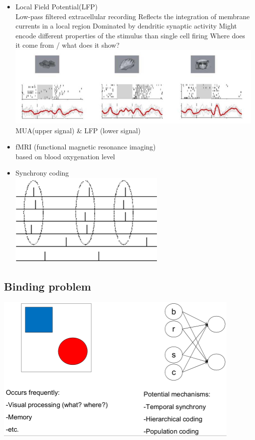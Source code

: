 \documentclass[english,11pt]{article}
\begin{document}
\begin{itemize}
\item  Local Field Potential(LFP)\\
\subitem Low-pass filtered extracellular recording
\subitem Reflects the integration of membrane currents in a local region
\subitem Dominated by dendritic synaptic activity
\subitem Might encode different properties of the stimulus than single cell firing
\subitem Where does it come from / what does it show?
\subitem\includegraphics[width=\textwidth]{MUA-LFP.png}\\
MUA(upper signal) \& LFP (lower signal)
\item  fMRI (functional magnetic resonance imaging)\\ based on blood oxygenation level
\item  Synchrony coding\\
\includegraphics[width=0.6\textwidth]{synchrony-code.png}
\end{itemize}


\subsection{Binding problem}
\includegraphics[width=0.9\textwidth]{binding-problem.png}
\end{document}

